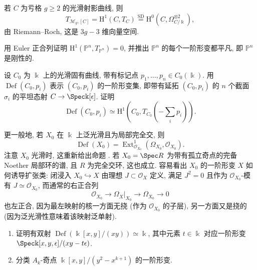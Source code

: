\begin{example}\label{src:C.1.12}
若 $C$ 为亏格 $g\geq2$ 的光滑射影曲线, 则
\[
T_{\mathcal M_g,[C]}=\mathrm H^1(C,T_C)\overset{\mathrm{SD}}{=}\mathrm H^0(C,\Omega_{C/\Bbbk}^{\otimes2}),
\]
由 Riemann--Roch, 这是 $3g-3$ 维向量空间.
\end{example}
\begin{exercise}[简单]\label{src:C.1.13}
用 Euler 正合列证明 $\mathrm H^1(\mathbb P^n,T_{\mathbb P^n})=0$, 并推出 $\mathbb P^n$ 的每个一阶形变都平凡, 即 $\mathbb P^n$ 是刚性的.
\end{exercise}
\begin{exercise}[中等]\label{src:C.1.14}
设 $C_0$ 为 $\Bbbk$ 上的光滑固有曲线, 带有标记点 $p_1,\ldots,p_n\in C_0(\Bbbk)$. 用 $\operatorname{Def}(C_0,p_i)$ 表示 $(C_0,p_i)$ 的一阶形变集, 即带有延拓 $(C_0,p_i)$ 的 $n$ 个截面 $\sigma_i$ 的平坦态射 $C\to\Spec\Bbbk[\epsilon]$. 证明
\[
\operatorname{Def}(C_0,p_i)\simeq\mathrm H^1\left(C_0,T_{C_0}(-\sum_i p_i)\right).
\]
\end{exercise}
\begin{remark}\label{src:C.1.15}
更一般地, 若 $X_0$ 在 $\Bbbk$ 上泛光滑且为局部完全交, 则
\[
\operatorname{Def}(X_0)=\operatorname{Ext}_{\mathcal O_{X_0}}^1(\Omega_{X_0},\mathcal O_{X_0}).
\]
注意 $X_0$ 光滑时, 这重新给出命题 . 若 $X_0=\Spec R$ 为带有孤立奇点的完备 Noether 局部环的谱, 且 $R$ 为完全交环, 这也成立. 容易看出 $X_0$ 的一阶形变 $X$ 如何诱导扩张类: 闭浸入 $X_0\hookrightarrow X$ 由理想 $J\subset\mathcal O_X$ 定义, 满足 $J^2=0$ 且作为 $\mathcal O_{X_0}$-模有 $J\simeq\mathcal O_{X_0}$, 而通常的右正合列
\[
\mathcal O_{X_0}\to\Omega_X|_{X_0}\to\Omega_{X_0}\to0
\]
也左正合, 因为最左映射的核一方面无挠 (作为 $\mathcal O_{X_0}$ 的子层), 另一方面又是挠的 (因为泛光滑性意味着该映射泛单射).
\end{remark}
\begin{exercise}[适合练习]\label{src:C.1.16}
\begin{enumerate}[(1)]
\item 证明有双射 $\operatorname{Def}(\Bbbk[x,y]/(xy))\simeq\Bbbk$, 其中元素 $t\in\Bbbk$ 对应一阶形变 $\Spec\Bbbk[x,y,\epsilon]/(xy-t\epsilon)$.
\item 分类 $A_k$-奇点 $\Bbbk[x,y]/(y^2-x^{k+1})$ 的一阶形变.
\end{enumerate}
\end{exercise}
